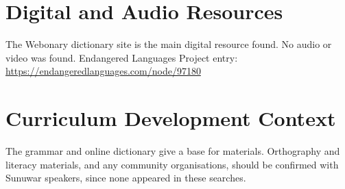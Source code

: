 \documentclass[12pt]{article}
\begin{document}
\section{Digital and Audio Resources}
The Webonary dictionary site is the main digital resource found. No audio or video was found. Endangered Languages Project entry: \url{https://endangeredlanguages.com/node/97180}

\section{Curriculum Development Context}
The grammar and online dictionary give a base for materials. Orthography and literacy materials, and any community organisations, should be confirmed with Sunuwar speakers, since none appeared in these searches.
\end{document}
